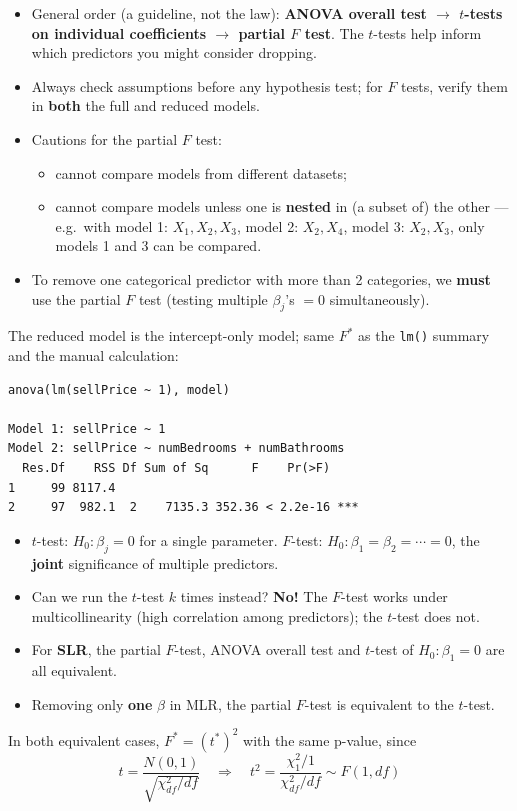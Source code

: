 \begin{itemize}
    \item General order (a guideline, not the law): \textbf{ANOVA overall test $\to$ $t$-tests
    on individual coefficients $\to$ partial $F$ test}. The $t$-tests help inform which
    predictors you might consider dropping.
    \item Always check assumptions before any hypothesis test; for $F$ tests, verify them in
    \textbf{both} the full and reduced models.
    \item Cautions for the partial $F$ test:
    \begin{itemize}
        \item cannot compare models from different datasets;
        \item cannot compare models unless one is \textbf{nested} in (a subset of) the other ---
        e.g.\ with model 1: $X_1,X_2,X_3$, model 2: $X_2,X_4$, model 3: $X_2,X_3$, only models 1
        and 3 can be compared.
    \end{itemize}
    \item To remove one categorical predictor with more than 2 categories, we \textbf{must} use
    the partial $F$ test (testing multiple $\beta_j$'s $=0$ simultaneously).
\end{itemize}

\begin{example}
    The reduced model is the intercept-only model; same $F^*$ as the \texttt{lm()} summary and
    the manual calculation:
\begin{verbatim}
anova(lm(sellPrice ~ 1), model)

Model 1: sellPrice ~ 1
Model 2: sellPrice ~ numBedrooms + numBathrooms
  Res.Df    RSS Df Sum of Sq      F    Pr(>F)
1     99 8117.4
2     97  982.1  2    7135.3 352.36 < 2.2e-16 ***
\end{verbatim}
\end{example}

\begin{remark}
    \begin{itemize}
        \item $t$-test: $H_0:\beta_j=0$ for a single parameter. $F$-test: $H_0:\beta_1=\beta_2=\cdots=0$,
        the \textbf{joint} significance of multiple predictors.
        \item Can we run the $t$-test $k$ times instead? \textbf{No!} The $F$-test works under
        multicollinearity (high correlation among predictors); the $t$-test does not.
        \item For \textbf{SLR}, the partial $F$-test, ANOVA overall test and $t$-test of
        $H_0:\beta_1=0$ are all equivalent.
        \item Removing only \textbf{one} $\beta$ in MLR, the partial $F$-test is equivalent to the $t$-test.
    \end{itemize}
    In both equivalent cases, $\boxed{F^*=(t^*)^2}$ with the same p-value, since
    \[t=\frac{N(0,1)}{\sqrt{\chi^2_{df}/df}}\quad\Rightarrow\quad t^2=\frac{\chi^2_1/1}{\chi^2_{df}/df}\sim F(1,df)\]
\end{remark}

